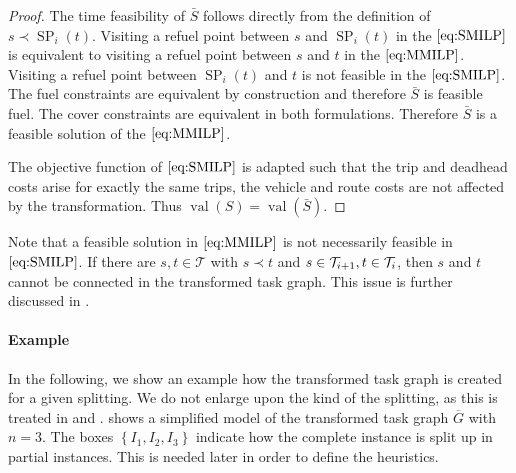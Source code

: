 \begin{proof}
The time feasibility of $\bar{S}$ follows directly from the definition of ${s\prec\operatorname{SP}_i(t)}$. Visiting a refuel point between $s$ and $\operatorname{SP}_i(t)$ in the $\eqref{eq:SMILP}$ is equivalent to visiting a refuel point between $s$ and $t$ in the $\eqref{eq:MMILP}$. Visiting a refuel point between $\operatorname{SP}_i(t)$ and $t$ is not feasible in the $\eqref{eq:SMILP}$. The fuel constraints are equivalent by construction and therefore $\bar{S}$ is feasible \wrt fuel. The cover constraints are equivalent in both formulations. Therefore $\bar{S}$ is a feasible solution of the $\eqref{eq:MMILP}$.

The objective function of $\eqref{eq:SMILP}$ is adapted such that the trip and deadhead costs arise for exactly the same trips, the vehicle and route costs are not affected by the transformation. Thus ${\operatorname{val}(S)=\operatorname{val}(\bar{S})}$.

\end{proof}

\begin{remark}

Note that a feasible solution in $\eqref{eq:MMILP}$ is not necessarily feasible in $\eqref{eq:SMILP}$. If there are ${s,t\in\mathcal{T}}$ with ${s\prec t}$ and ${s\in\mathcal{T}_{i+1}}, {t\in\mathcal{T}_i}$, then $s$ and $t$ cannot be connected in the transformed task graph. This issue is further discussed in .

\end{remark}

\paragraph{Example} \parfill

In the following, we show an example how the transformed task graph is created for a given splitting. We do not enlarge upon the kind of the splitting, as this is treated in  and .  shows a simplified model of the transformed task graph $\overline{G}$ with $n=3$. The boxes $\left\{I_1,I_2,I_3\right\}$ indicate how the complete instance is split up in partial instances. This is needed later in order to define the heuristics.

